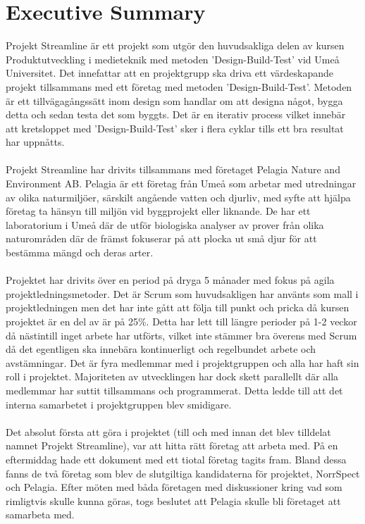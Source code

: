 \section{Executive Summary}
Projekt Streamline är ett projekt som utgör den huvudsakliga delen av kursen Produktutveckling i medieteknik med metoden 'Design-Build-Test' vid Umeå Universitet. Det innefattar att en projektgrupp ska driva ett värdeskapande projekt tillsammans med ett företag med metoden 'Design-Build-Test'. Metoden är ett tillvägagångssätt inom design som handlar om att designa något, bygga detta och sedan testa det som byggts. Det är en iterativ process vilket innebär att kretsloppet med 'Design-Build-Test' sker i flera cyklar tills ett bra resultat har uppnåtts.
\\
\\
Projekt Streamline har drivits tillsammans med företaget Pelagia Nature and Environment AB. Pelagia är ett företag från Umeå som arbetar med utredningar av olika naturmiljöer, särskilt angående vatten och djurliv, med syfte att hjälpa företag ta hänsyn till miljön vid byggprojekt eller liknande. De har ett laboratorium i Umeå där de utför biologiska analyser av prover från olika naturområden där de främst fokuserar på att plocka ut små djur för att bestämma mängd och deras arter.
\\
\\
Projektet har drivits över en period på dryga 5 månader med fokus på agila projektledningsmetoder. Det är Scrum som huvudsakligen har använts som mall i projektledningen men det har inte gått att följa till punkt och pricka då kursen projektet är en del av är på 25\%. Detta har lett till längre perioder på 1-2 veckor då nästintill inget arbete har utförts, vilket inte stämmer bra överens med Scrum då det egentligen ska innebära kontinuerligt och regelbundet arbete och avstämningar. Det är fyra medlemmar med i projektgruppen och alla har haft sin roll i projektet. Majoriteten av utvecklingen har dock skett parallellt där alla medlemmar har suttit tillsammans och programmerat. Detta ledde till att det interna samarbetet i projektgruppen blev smidigare.
\\
\\
Det absolut första att göra i projektet (till och med innan det blev tilldelat namnet Projekt Streamline), var att hitta rätt företag att arbeta med. På en eftermiddag hade ett dokument med ett tiotal företag tagits fram. Bland dessa fanns de två företag som blev de slutgiltiga kandidaterna för projektet, NorrSpect och Pelagia. Efter möten med båda företagen med diskussioner kring vad som rimligtvis skulle kunna göras, togs beslutet att Pelagia skulle bli företaget att samarbeta med. 
